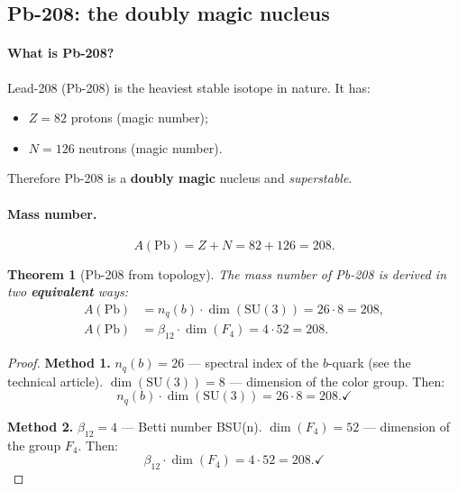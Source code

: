 \documentclass[11pt,a4paper]{article}
\newcommand{\SU}{\mathrm{SU}}
\newtheorem{theorem}{Theorem}[section]
\theoremstyle{definition}
\begin{document}
\subsection{Pb-208: the doubly magic nucleus}
\label{subsec:pb208}

\paragraph{What is Pb-208?}
Lead-208 (Pb-208) is the heaviest stable isotope 
in nature. It has:
\begin{itemize}
    \item $Z = 82$ protons (magic number);
    \item $N = 126$ neutrons (magic number).
\end{itemize}
Therefore Pb-208 is a \textbf{doubly magic} nucleus and 
\emph{superstable}.

\paragraph{Mass number.}
\begin{equation}
    A(\text{Pb}) = Z + N = 82 + 126 = 208.
\end{equation}

\begin{theorem}[Pb-208 from topology]
\label{thm:pb208}
The mass number of Pb-208 is derived in two \textbf{equivalent} 
ways:
\begin{align}
    A(\text{Pb}) &= n_q(b) \cdot \dim(\SU(3))
                  = 26 \cdot 8 = 208,
    \label{eq:pb208-1} \\[0.3em]
    A(\text{Pb}) &= \beta_{12} \cdot \dim(F_4)
                  = 4 \cdot 52 = 208.
    \label{eq:pb208-2}
\end{align}
\end{theorem}

\begin{proof}
\textbf{Method 1.} $n_q(b) = 26$ — spectral index of the 
$b$-quark (see the technical article). 
$\dim(\SU(3)) = 8$ — dimension of the color group. Then:
\begin{equation}
    n_q(b) \cdot \dim(\SU(3)) = 26 \cdot 8 = 208. \checkmark
\end{equation}

\medskip\noindent
\textbf{Method 2.} $\beta_{12} = 4$ — Betti number BSU(n). 
$\dim(F_4) = 52$ — dimension of the group $F_4$. Then:
\begin{equation}
    \beta_{12} \cdot \dim(F_4) = 4 \cdot 52 = 208. \checkmark
\end{equation}
\end{proof}
\end{document}
